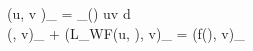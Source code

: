 \left(u, v \right)_{\tau} = \int_{\Omega(\tau)} uv d\Omega \\ 
\left(, v\right)_{\tau} + \left(L_{WF}(u, \tau), v\right)_{\tau} = \left(f(\tau), v\right)_{\tau}
